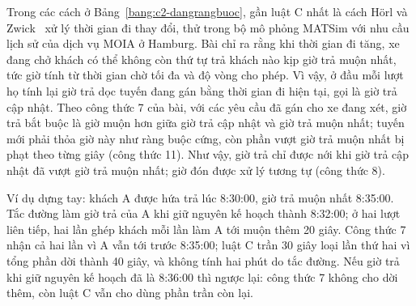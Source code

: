 Trong các cách ở Bảng~\ref{bang:c2-dangrangbuoc}, gần luật C nhất là cách Hörl và Zwick~\cite{horl2022} xử lý thời
gian đi thay đổi, thử trong bộ mô phỏng MATSim với nhu cầu lịch sử của dịch vụ MOIA ở Hamburg. Bài chỉ ra rằng khi
thời gian đi tăng, xe đang chở khách có thể không còn thứ tự trả khách nào kịp giờ trả muộn nhất, tức giờ tính từ thời
gian chờ tối đa và độ vòng cho phép. Vì vậy, ở đầu mỗi lượt họ tính lại giờ trả dọc tuyến đang gán bằng thời gian đi hiện
tại, gọi là giờ trả cập nhật. Theo công thức 7 của bài, với các yêu cầu đã gán cho xe đang xét, giờ trả bắt buộc là
giờ muộn hơn giữa giờ trả cập nhật và giờ trả muộn nhất; tuyến mới phải thỏa giờ này như ràng buộc cứng, còn phần vượt
giờ trả muộn nhất bị phạt theo từng giây (công thức 11). Như vậy, giờ trả chỉ được nới khi giờ trả cập nhật đã vượt
giờ trả muộn nhất; giờ đón được xử lý tương tự (công thức 8).

Ví dụ dựng tay: khách A được hứa trả lúc 8:30:00, giờ trả muộn nhất 8:35:00. Tắc đường làm giờ trả của A khi giữ
nguyên kế hoạch thành 8:32:00; ở hai lượt liên tiếp, hai lần ghép khách mỗi lần làm A tới muộn thêm 20 giây. Công thức
7 nhận cả hai lần vì A vẫn tới trước 8:35:00; luật C trần 30 giây loại lần thứ hai vì tổng phần dời thành 40 giây,
và không tính hai phút do tắc đường. Nếu giờ trả khi giữ nguyên kế hoạch đã là 8:36:00 thì ngược lại: công thức 7
không cho dời thêm, còn luật C vẫn cho dùng phần trần còn lại.


